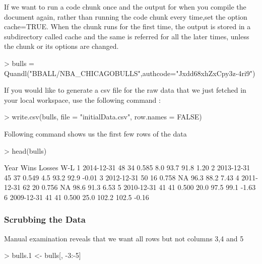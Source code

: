 \documentclass[a4paper]{article}
\begin{document}
If we want to run a code chunk once and the output for when you compile the document again, rather than running the code chunk every time,set the option cache=TRUE.
When the chunk runs for the first time, the output is stored in a subdirectory called cache and the same is referred for all the later times, unless the chunk or its options are changed.

\begin{Schunk}
\begin{Sinput}
> bulls = Quandl("BBALL/NBA_CHICAGOBULLS",authcode="Jxdd68xhZxCpy3z-4ri9")
\end{Sinput}
\end{Schunk}

If you would like to generate a csv file for the raw data that we just fetched in your local workspace, use the following command :
\begin{Schunk}
\begin{Sinput}
> write.csv(bulls, file = "initialData.csv", row.names = FALSE)
\end{Sinput}
\end{Schunk}


Following command shows us the first few rows of the data
\begin{Schunk}
\begin{Sinput}
> head(bulls)
\end{Sinput}
\begin{Soutput}
        Year Wins Losses  W-L%
1 2014-12-31   48     34 0.585  8.0  93.7  91.8  1.20
2 2013-12-31   45     37 0.549  4.5  93.2  92.9 -0.01
3 2012-12-31   50     16 0.758   NA  96.3  88.2  7.43
4 2011-12-31   62     20 0.756   NA  98.6  91.3  6.53
5 2010-12-31   41     41 0.500 20.0  97.5  99.1 -1.63
6 2009-12-31   41     41 0.500 25.0 102.2 102.5 -0.16
\end{Soutput}
\end{Schunk}


\subsubsection{Scrubbing the Data}

Manual examination reveals that we want all rows but not columns 3,4 and 5

\begin{Schunk}
\begin{Sinput}
> bulls.1 <- bulls[, -3:-5]
\end{Sinput}
\end{Schunk}
\end{document}
